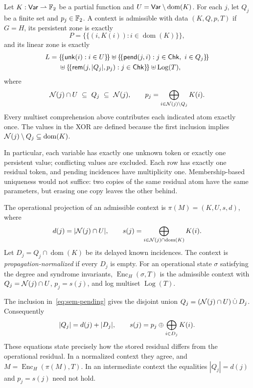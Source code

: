 \begin{defi}
\label{def:sem-admissible}
Let $K:\mathsf{Var}\rightharpoonup\mathbb{F}_2$ be a partial function and
$U=\mathsf{Var}\setminus\operatorname{dom}(K)$. For each $j$, let $Q_j$ be a finite
set and $p_j\in\mathbb{F}_2$. A context is admissible with data $(K,Q,p,T)$ if
$G=H$, its persistent zone is exactly
\[
 P=\{\!\{(i,K(i)):i\in\operatorname{dom}(K)\}\!\},
\]
and its linear zone is exactly
\begin{align*}
L={}&\{\!\{\mathsf{unk}(i):i\in U\}\!\}\uplus
 \{\!\{\mathsf{pend}(j,i):j\in\mathsf{Chk},\ i\in Q_j\}\!\}\\
 &\uplus\{\!\{\mathsf{rem}(j,|Q_j|,p_j):j\in\mathsf{Chk}\}\!\}
 \uplus\operatorname{Log}(T),
\end{align*}
where
\begin{equation}
\label{eq:sem-pending}
 \mathcal{N}(j)\cap U\ \subseteq\ Q_j\ \subseteq\ \mathcal{N}(j),
 \qquad
 p_j=\bigoplus_{i\in\mathcal{N}(j)\setminus Q_j}K(i).
\end{equation}
Every multiset comprehension above contributes each indicated atom exactly
once. The values in the XOR are defined because the first inclusion implies
$\mathcal{N}(j)\setminus Q_j\subseteq\operatorname{dom}(K)$.
\end{defi}

In particular, each variable has exactly one unknown token or exactly one
persistent value; conflicting values are excluded. Each row has exactly one
residual token, and pending incidences have multiplicity one. Membership-based
uniqueness would not suffice: two copies of the same residual atom have the
same parameters, but erasing one copy leaves the other behind.

\begin{defi}
\label{def:sem-projection}
The operational projection of an admissible context is
$\pi(M)=(K,U,s,d)$, where
\[
 d(j)=|\mathcal{N}(j)\cap U|,
 \qquad s(j)=\bigoplus_{i\in\mathcal{N}(j)\cap\operatorname{dom}(K)}K(i).
\]
Let $D_j=Q_j\cap\operatorname{dom}(K)$ be its delayed known incidences.
The context is \emph{propagation-normalized} if every $D_j$ is empty.
For an operational state $\sigma$ satisfying the degree and syndrome invariants,
$\operatorname{Enc}_H(\sigma,T)$ is the admissible context with
$Q_j=\mathcal{N}(j)\cap U$, $p_j=s(j)$, and log multiset $\operatorname{Log}(T)$.
\end{defi}

The inclusion in~\eqref{eq:sem-pending} gives the disjoint union
$Q_j=(\mathcal{N}(j)\cap U)\mathbin{\dot\cup}D_j$. Consequently
\begin{equation}
\label{eq:sem-delayed}
 |Q_j|=d(j)+|D_j|,
 \qquad s(j)=p_j\oplus\bigoplus_{i\in D_j}K(i).
\end{equation}
These equations state precisely how the stored residual differs from the
operational residual. In a normalized context they agree, and
$M=\operatorname{Enc}_H(\pi(M),T)$. In an intermediate context the equalities
$|Q_j|=d(j)$ and $p_j=s(j)$ need not hold.

